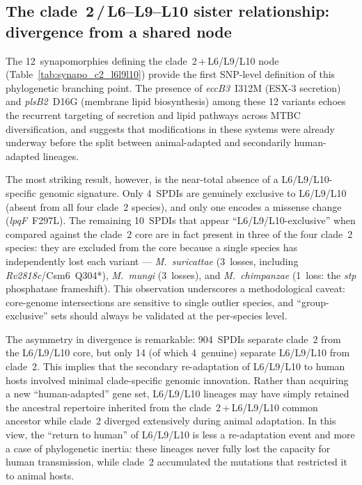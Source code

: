 \documentclass[11pt,a4paper]{article}
\newcommand{\Msur}{\textit{M.~suricattae}}
\newcommand{\Mmun}{\textit{M.~mungi}}
\newcommand{\Mchi}{\textit{M.~chimpanzae}}
\begin{document}
\subsection{The clade~2\,/\,L6--L9--L10 sister relationship: divergence from a shared node}
\label{sec:disc:c2_l6l9l10}

The 12~synapomorphies defining the clade~2\,+\,L6/L9/L10 node
(Table~\ref{tab:synapo_c2_l6l9l10}) provide the first SNP-level definition
of this phylogenetic branching point.
%
The presence of \textit{eccB3}~I312M (ESX-3 secretion) and
\textit{plsB2}~D16G (membrane lipid biosynthesis) among these 12 variants
echoes the recurrent targeting of secretion and lipid pathways across MTBC
diversification, and suggests that modifications in these systems were already
underway before the split between animal-adapted and secondarily human-adapted
lineages.

The most striking result, however, is the near-total absence of a
L6/L9/L10-specific genomic signature.
%
Only 4~SPDIs are genuinely exclusive to L6/L9/L10 (absent from all four
clade~2 species), and only one encodes a missense change
(\textit{lpqF}~F297L).
%
The remaining 10~SPDIs that appear ``L6/L9/L10-exclusive'' when compared
against the clade~2 core are in fact present in three of the four clade~2
species: they are excluded from the core because a single species has
independently lost each variant --- \Msur{} (3~losses, including
\textit{Rv2818c}/Csm6~Q304*), \Mmun{} (3~losses), and \Mchi{}
(1~loss: the \textit{stp} phosphatase frameshift).
%
This observation underscores a methodological caveat: core-genome
intersections are sensitive to single outlier species, and
``group-exclusive'' sets should always be validated at the per-species level.

The asymmetry in divergence is remarkable: 904~SPDIs separate clade~2 from
the L6/L9/L10 core, but only 14 (of which 4~genuine) separate L6/L9/L10
from clade~2.
%
This implies that the secondary re-adaptation of L6/L9/L10 to human hosts
involved minimal clade-specific genomic innovation.
%
Rather than acquiring a new ``human-adapted'' gene set, L6/L9/L10 lineages
may have simply retained the ancestral repertoire inherited from the
clade~2\,+\,L6/L9/L10 common ancestor while clade~2 diverged extensively
during animal adaptation.
%
In this view, the ``return to human'' of L6/L9/L10 is less a re-adaptation
event and more a case of phylogenetic inertia: these lineages never fully
lost the capacity for human transmission, while clade~2 accumulated the
mutations that restricted it to animal hosts.
\end{document}
